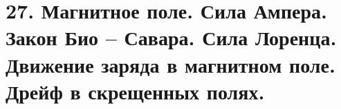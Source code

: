 \section*{27. Магнитное поле. Сила Ампера. Закон Био – Савара. Сила Лоренца.
Движение заряда в магнитном поле. Дрейф в скрещенных полях.}
 


